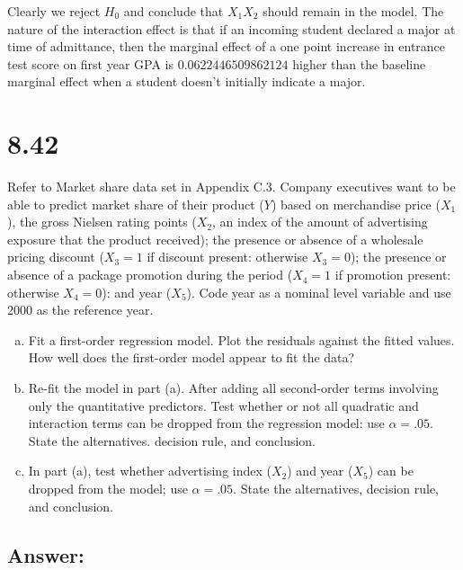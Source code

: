 \documentclass{article}
\begin{document}
\begin{enumerate}[a)]
Clearly we reject $H_0$ and conclude that $X_1X_2$ should remain in the model. The nature of the interaction effect is that if an incoming student declared a major at time of admittance, then the marginal effect of a one point increase in entrance test score on first year GPA is $0.0622446509862124$ higher than the baseline marginal effect when a student doesn't initially indicate a major.

\end{enumerate}

\section{8.42}

Refer to Market share data set in Appendix C.3. Company executives want to be able to predict market share of their product ($Y$) based on merchandise price ($X_1$), the gross Nielsen rating points ($X_2$, an index of the amount of advertising exposure that the product received); the presence or absence of a wholesale pricing discount ($X_3 = 1$ if discount present: otherwise $X_3 = 0$); the presence or absence of a package promotion during the period ($X_4 = 1$ if promotion present: otherwise $X_4 = 0$): and year ($X_5$). Code year as a nominal level variable and use 2000 as the reference year.

\begin{enumerate}[a)]
\item{} Fit a first-order regression model. Plot the residuals against the fitted values. How well does the first-order model appear to fit the data?
\item{} Re-fit the model in part (a). After adding all second-order terms involving only the quantitative predictors. Test whether or not all quadratic and interaction terms can be dropped from the regression model: use $\alpha = .05$. State the alternatives. decision rule, and conclusion.
\item{} In part (a), test whether advertising index ($X_2$) and year ($X_5$) can be dropped from the model; use $\alpha = .05$. State the alternatives, decision rule, and conclusion.
\end{enumerate}

\subsection{Answer:}
\end{document}
